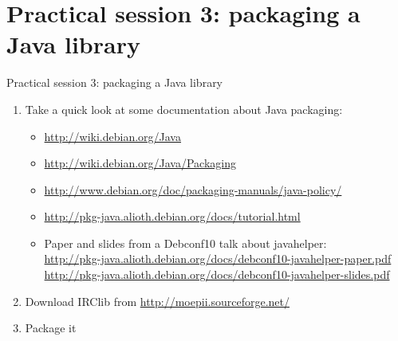 \documentclass[10pt,final]{beamer}
\begin{document}
\section{Practical session 3: packaging a Java library}
\begin{frame}{Practical session 3: packaging a Java library}
\begin{enumerate}
	\item Take a quick look at some documentation about Java packaging:\\
		\begin{itemize}
		\item \url{http://wiki.debian.org/Java}
		\item \url{http://wiki.debian.org/Java/Packaging}
		\item \url{http://www.debian.org/doc/packaging-manuals/java-policy/}
		\item \url{http://pkg-java.alioth.debian.org/docs/tutorial.html}
		\item Paper and slides from a Debconf10 talk about javahelper:\\
			{\footnotesize
			\url{http://pkg-java.alioth.debian.org/docs/debconf10-javahelper-paper.pdf}\\
			\url{http://pkg-java.alioth.debian.org/docs/debconf10-javahelper-slides.pdf}}
		\end{itemize}
		\br
	\item Download IRClib from \url{http://moepii.sourceforge.net/}
		\br
	\item Package it
\end{enumerate}
\end{frame}

\backupbegin

\backupend
\end{document}
